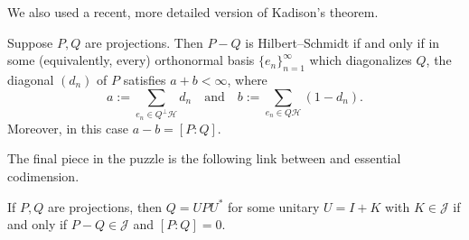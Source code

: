 \documentclass{article}
\newcommand{\Hil}{\ensuremath{\mathcal{H}}}
\begin{document}
We also used a recent, more detailed version of Kadison's theorem.

\begin{theorem}
  Suppose $P,Q$ are projections. Then $P-Q$ is Hilbert--Schmidt if and only if in some (equivalently, every) orthonormal basis $\{e_n\}_{n=1}^{\infty}$ which diagonalizes $Q$, the diagonal $(d_n)$ of $P$ satisfies $a+b < \infty$, where
  \begin{equation*}
    a := \sum_{e_n \in Q^{\perp}\Hil} d_n \quad\text{and}\quad b := \sum_{e_n \in Q\Hil} (1-d_n).
  \end{equation*}
  Moreover, in this case $a-b = [P:Q]$.
\end{theorem}

The final piece in the puzzle is the following link between  and essential codimension.

\begin{proposition}
  If $P,Q$ are projections, then $Q = UPU^{*}$ for some unitary $U = I+K$ with $K \in \mathcal{J}$ if and only if $P-Q \in \mathcal{J}$ and $[P:Q] = 0$.
\end{proposition}

\end{document}

